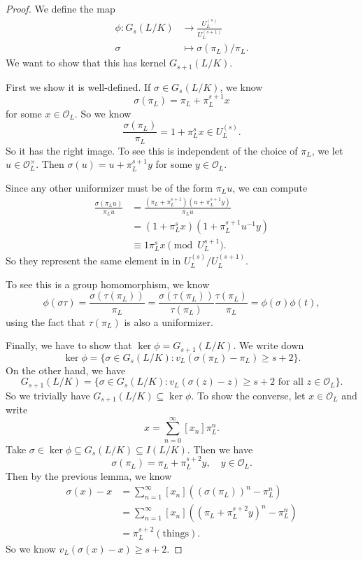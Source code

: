 \documentclass[a4paper]{article}
\begin{document}
\begin{proof}
  We define the map
  \begin{align*}
    \phi: G_s(L/K) &\to \frac{U_L^{(s)}}{U_L^{(s + 1)}}\\
    \sigma &\mapsto \sigma(\pi_L)/\pi_L.
  \end{align*}
  We want to show that this has kernel $G_{s + 1}(L/K)$.

  First we show it is well-defined. If $\sigma \in G_s(L/K)$, we know
  \[
    \sigma(\pi_L) = \pi_L + \pi_L^{s + 1}x
  \]
  for some $x \in \mathcal{O}_L$. So we know
  \[
    \frac{\sigma(\pi_L)}{\pi_L} = 1 + \pi_L^s x \in U_L^{(s)}.
  \]
  So it has the right image. To see this is independent of the choice of $\pi_L$, we let $u \in \mathcal{O}_L^\times$. Then $\sigma(u) = u + \pi_L^{s + 1}y$ for some $y \in \mathcal{O}_L$.

  Since any other uniformizer must be of the form $\pi_L u$, we can compute
  \begin{align*}
    \frac{\sigma(\pi_L u)}{\pi_L u} &= \frac{(\pi_L + \pi_L^{s + 1})(u + \pi_L^{s + 1}y)}{\pi_L u} \\
    &= (1 + \pi_L^s x) (1 + \pi_L^{s + 1} u^{-1}y) \\
    &\equiv 1 \pi_L^s x \pmod {U_L^{s + 1}}.
  \end{align*}
  So they represent the same element in in $U_L^{(s)}/U_L^{(s + 1)}$.

  To see this is a group homomorphism, we know
  \[
    \phi(\sigma\tau) = \frac{\sigma(\tau(\pi_L))}{\pi_L} = \frac{\sigma(\tau(\pi_L))}{\tau(\pi_L)} \frac{\tau(\pi_L)}{\pi_L} = \phi(\sigma)\phi(t),
  \]
  using the fact that $\tau(\pi_L)$ is also a uniformizer.

  Finally, we have to show that $\ker \phi = G_{s + 1}(L/K)$. We write down
  \[
    \ker \phi = \{\sigma \in G_s(L/K): v_L(\sigma(\pi_L) - \pi_L) \geq s + 2\}.
  \]
  On the other hand, we have
  \[
    G_{s + 1}(L/K) = \{\sigma \in G_s(L/K): v_L(\sigma(z) - z) \geq s + 2\text{ for all }z \in \mathcal{O}_L\}.
  \]
  So we trivially have $G_{s + 1}(L/K) \subseteq \ker \phi$. To show the converse, let $x \in \mathcal{O}_L$ and write
  \[
    x = \sum_{n = 0}^\infty [x_n] \pi_L^n.
  \]
  Take $\sigma \in \ker \phi \subseteq G_s(L/K) \subseteq I(L/K)$. Then we have
  \[
    \sigma(\pi_L) = \pi_L + \pi_L^{s + 2} y,\quad y \in \mathcal{O}_L.
  \]
  Then by the previous lemma, we know
  \begin{align*}
    \sigma(x) - x &= \sum_{n = 1}^\infty [x_n] \left((\sigma (\pi_L))^n - \pi_L^n\right)\\
    &= \sum_{n = 1}^\infty [x_n] \left((\pi_L + \pi_L^{s + 2} y)^n - \pi_L^n\right)\\
    &= \pi_L^{s + 2}(\text{things}).
  \end{align*}
  So we know $v_L(\sigma(x) - x) \geq s + 2$.
\end{proof}
\end{document}
